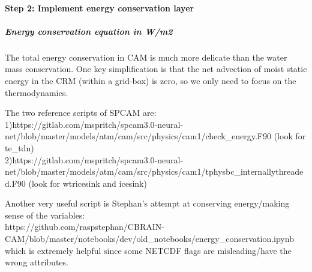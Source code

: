 \documentclass[11pt]{article}
\begin{document}
    \hypertarget{step-2-implement-energy-conservation-layer}{%
\paragraph{Step 2: Implement energy conservation
layer}\label{step-2-implement-energy-conservation-layer}}

\hypertarget{energy-conservation-equation-in-wm2}{%
\subparagraph{Energy conservation equation in
W/m2}\label{energy-conservation-equation-in-wm2}}

The total energy conservation in CAM is much more delicate than the
water mass conservation. One key simplification is that the net
advection of moist static energy in the CRM (within a grid-box) is zero,
so we only need to focus on the thermodynamics.

The two reference scripts of SPCAM are:\\
1)https://gitlab.com/mspritch/spcam3.0-neural-net/blob/master/models/atm/cam/src/physics/cam1/check\_energy.F90
(look for te\_tdn)\\
2)https://gitlab.com/mspritch/spcam3.0-neural-net/blob/master/models/atm/cam/src/physics/cam1/tphysbc\_internallythreaded.F90
(look for wtricesink and icesink)

Another very useful script is Stephan's attempt at conserving
energy/making sense of the variables:\\
https://github.com/raspstephan/CBRAIN-CAM/blob/master/notebooks/dev/old\_notebooks/energy\_conservation.ipynb\\
which is extremely helpful since some NETCDF flags are misleading/have
the wrong attributes.
\end{document}
